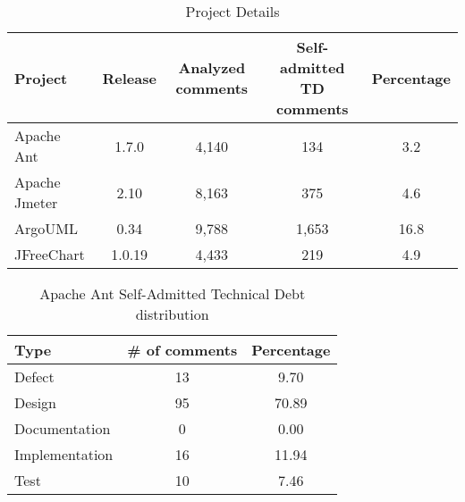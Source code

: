 
\begin{table*}[!hbt]
      \begin{center}
            \caption{Project Details}
            \label{tab:project_details}
            \begin{tabular}{l| c c c c }
            \toprule
            \textbf{Project}   & \textbf{Release}          & \textbf{Analyzed comments}     & \textbf{Self-admitted TD comments} & \textbf{Percentage} \\ \midrule 
              Apache Ant       & 1.7.0                     & 4,140                          & 134                                & 3.2  \\                                   
              Apache Jmeter    & 2.10                      & 8,163                          & 375                                & 4.6  \\                                   
              ArgoUML          & 0.34                      & 9,788                          & 1,653                              & 16.8 \\                                   
              JFreeChart       & 1.0.19                    & 4,433                          & 219                                & 4.9  \\ \bottomrule
            \end{tabular}
      \end{center}
\end{table*}


\begin{table*}[!hbt]
      \begin{center}
            \caption{Apache Ant Self-Admitted Technical Debt distribution}
            \label{tab:ant_td_details}
            \begin{tabular}{l| c c }
            \toprule
            \textbf{Type}   & \textbf{\# of comments}     & \textbf{Percentage}  \\ \midrule 
             Defect          & 13             & 9.70\\     
             Design          & 95             & 70.89\\    
             Documentation   & 0              & 0.00\\      
             Implementation  & 16             & 11.94\\    
             Test            & 10             & 7.46\\  \bottomrule                                   
            \end{tabular}
      \end{center}
\end{table*}

